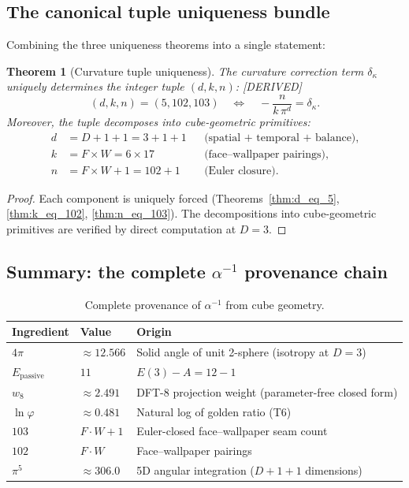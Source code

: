 \documentclass[11pt,a4paper]{article}
\newtheorem{theorem}{Theorem}[section]
\theoremstyle{definition}
\theoremstyle{remark}
\newcommand{\phig}{\varphi}
\newcommand{\Epass}{E_{\mathrm{passive}}}
\newcommand{\dkappa}{\delta_\kappa}
\newcommand{\weig}{w_8}
\newcommand{\DERIVED}{\textcolor{blue!70!black}{\footnotesize\textsf{[DERIVED]}}}
\begin{document}
\subsection{The canonical tuple uniqueness bundle}

Combining the three uniqueness theorems into a single statement:

\begin{theorem}[Curvature tuple uniqueness]
\label{thm:curvature_tuple}
The curvature correction term $\dkappa$ uniquely determines the integer
tuple $(d, k, n)$: \DERIVED{}
\begin{equation}
  \boxed{(d, k, n) = (5, 102, 103)
  \quad\Longleftrightarrow\quad
  -\frac{n}{k\,\pi^d} = \dkappa.}
  \label{eq:tuple_unique}
\end{equation}
Moreover, the tuple decomposes into cube-geometric primitives:
\begin{align*}
  d &= D + 1 + 1 = 3 + 1 + 1 &&\text{(spatial + temporal + balance)}, \\
  k &= F \times W = 6 \times 17 &&\text{(face--wallpaper pairings)}, \\
  n &= F \times W + 1 = 102 + 1 &&\text{(Euler closure)}.
\end{align*}
\end{theorem}

\begin{proof}
Each component is uniquely forced (Theorems~\ref{thm:d_eq_5},
\ref{thm:k_eq_102}, \ref{thm:n_eq_103}).  The decompositions into
cube-geometric primitives are verified by direct computation at $D = 3$.
\end{proof}

\subsection{Summary: the complete $\alpha^{-1}$ provenance chain}

\begin{table}[h]
\centering
\caption{Complete provenance of $\alpha^{-1}$ from cube geometry.}
\label{tab:alpha_provenance}
\small
\begin{tabular}{@{}lll@{}}
\toprule
Ingredient & Value & Origin \\
\midrule
$4\pi$ & $\approx 12.566$ & Solid angle of unit 2-sphere (isotropy at $D=3$) \\
$\Epass$ & $11$ & $E(3) - A = 12 - 1$ \\
$\weig$ & $\approx 2.491$ & DFT-8 projection weight (parameter-free closed form) \\
$\ln\phig$ & $\approx 0.481$ & Natural log of golden ratio (T6) \\
$103$ & $F \cdot W + 1$ & Euler-closed face--wallpaper seam count \\
$102$ & $F \cdot W$ & Face--wallpaper pairings \\
$\pi^5$ & $\approx 306.0$ & 5D angular integration ($D + 1 + 1$ dimensions) \\
\bottomrule
\end{tabular}
\end{table}
\end{document}
